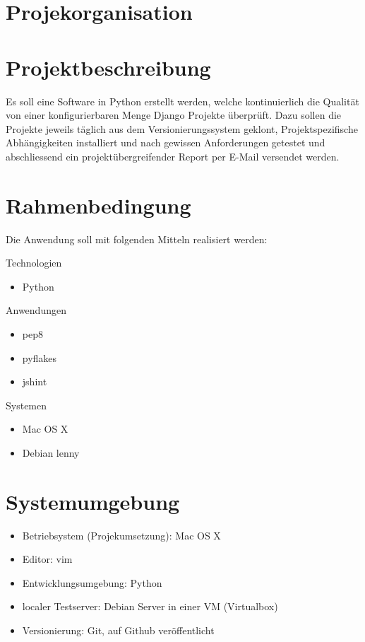 \section{Projekorganisation}

\begin{figure}[!ht]
\begin{center}
\end{center}
\end{figure}

\section{Projektbeschreibung}
Es soll eine Software in Python erstellt werden, welche kontinuierlich die Qualität von einer konfigurierbaren Menge Django Projekte überprüft. Dazu sollen die Projekte jeweils täglich aus dem Versionierungssystem geklont, Projektspezifische Abhängigkeiten installiert und nach gewissen Anforderungen getestet und abschliessend ein projektübergreifender Report per E-Mail versendet werden.

\section{Rahmenbedingung}
Die Anwendung soll mit folgenden Mitteln realisiert werden:

Technologien
\begin{itemize}
    \item Python 

\end{itemize}

Anwendungen
\begin{itemize}
    \item pep8
    \item pyflakes
    \item jshint
\end{itemize}

Systemen
\begin{itemize}
    \item Mac OS X
    \item Debian lenny
\end{itemize}
    
\section{Systemumgebung}
\begin{itemize}
    \item Betriebsystem (Projekumsetzung): Mac OS X
    \item Editor: vim
    \item Entwicklungsumgebung: Python
    \item localer Testserver: Debian Server in einer VM (Virtualbox) 
    \item Versionierung: Git, auf Github veröffentlicht
\end{itemize}
\clearpage
